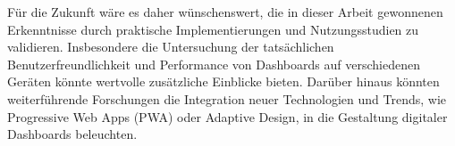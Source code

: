 Für die Zukunft wäre es daher wünschenswert, die in dieser Arbeit gewonnenen Erkenntnisse durch praktische Implementierungen und Nutzungsstudien zu validieren.
Insbesondere die Untersuchung der tatsächlichen Benutzerfreundlichkeit und Performance von Dashboards auf verschiedenen Geräten könnte wertvolle zusätzliche Einblicke bieten.
Darüber hinaus könnten weiterführende Forschungen die Integration neuer Technologien und Trends, wie Progressive Web Apps (PWA) oder Adaptive Design, in die Gestaltung digitaler Dashboards beleuchten.





